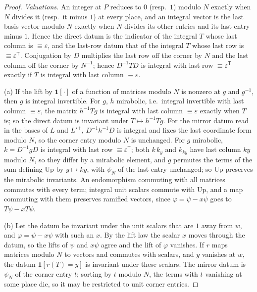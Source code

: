 \begin{proof}
\emph{Valuations.} An integer at $P$ reduces to $0$ (resp.\ $1$) modulo $N$ exactly when $N$ divides it (resp.\ it minus $1$) at every place, and an integral vector is the last basis vector modulo $N$ exactly when $N$ divides its other entries and its last entry minus $1$. Hence the direct datum is the indicator of the integral $T$ whose last column is $\equiv\varepsilon$, and the
last-row datum that of the integral $T$ whose last row is $\equiv\varepsilon^{\mathsf T}$. Conjugation by $D$ multiplies the last row off the corner by $N$ and the last column off the corner by $N^{-1}$; hence $D^{-1}TD$ is integral with last row $\equiv\varepsilon^{\mathsf T}$ exactly if $T$ is integral with last column $\equiv\varepsilon$.

(a) If the lift by $\mathbf1[\cdot]$ of a function of matrices modulo $N$ is nonzero at $g$ and $g^{-1}$, then $g$ is integral invertible. For $g$, $h$ mirabolic, i.e.\ integral invertible with last column $\equiv\varepsilon$, the matrix $h^{-1}Tg$ is integral with last column $\equiv\varepsilon$ exactly when $T$ is; so the direct datum is invariant under
$T\mapsto h^{-1}Tg$. For the mirror datum read in the bases of $L$ and $L'^+$, $D^{-1}h^{-1}D$ is integral and fixes the last coordinate form modulo $N$, so the corner entry modulo $N$ is unchanged. For $g$ mirabolic, $k=D^{-1}gD$ is integral with last row $\equiv\varepsilon^{\mathsf T}$; both $k\,k_y$ and $k_{ky}$ have last column $ky$
modulo $N$, so they differ by a mirabolic element, and $g$ permutes the terms of the sum defining $\mathrm{Up}$ by $y\mapsto ky$, with $\psi_N$ of the last entry unchanged; so $\mathrm{Up}$ preserves the mirabolic invariants. An endomorphism commuting with all matrices commutes with every term; integral unit scalars commute with $\mathrm{Up}$,
and a map commuting with them preserves ramified vectors, since $\varphi=\psi-x\psi$ goes to $T\psi-xT\psi$.

(b) Let the datum be invariant under the unit scalars that are $1$ away from $w$, and $\varphi=\psi-x\psi$ with such an $x$. By the lift law the scalar $x$ moves through the datum, so the lifts of $\psi$ and $x\psi$ agree and the lift of $\varphi$ vanishes. If $r$ maps matrices modulo $N$ to vectors and commutes with scalars, and $y$ vanishes at $w$, the
datum $\mathbf1[r(T)=y]$ is invariant under these scalars. The mirror datum is $\psi_N$ of the corner entry $t$; sorting by $t$ modulo $N$, the terms with $t$ vanishing at some place die, so it may be restricted to unit corner entries.


\end{proof}
